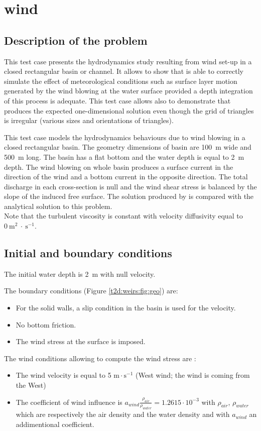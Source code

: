 \chapter{wind}
%
\section{Description of the problem}
\bigskip
This test case presents the hydrodynamics study resulting from wind set-up in a 
closed rectangular basin or channel.
It allows to show that  is able to correctly simulate the effect 
of meteorological conditions such as surface layer motion generated by the wind blowing
at the water surface provided a depth integration of this process is adequate.
This test case allows also to demonstrate that  produces the expected
one-dimensional solution even though the grid of triangles is irregular 
(various sizes and orientations of triangles).

\bigskip
This test case models the hydrodynamics behaviours due to wind blowing 
in a closed rectangular basin. The geometry dimensions of basin are 100~m wide 
and  500~m long. The basin has a flat bottom and the water depth is equal to 2~m depth. 
The wind blowing on whole basin produces a surface current in the direction of 
the wind and a bottom current in the opposite direction. The total discharge in each 
cross-section is null and the wind shear stress is balanced by the slope of the 
induced free surface. The solution produced by  is compared 
with the analytical solution to this problem. \\
Note that the turbulent viscosity is constant with velocity 
diffusivity equal to $0~\text{m}^2~\cdot~\text{s}^{-1}$.


\section{Initial and boundary conditions}
\bigskip
The initial water depth is 2~m with null velocity.

\bigskip
The boundary conditions (Figure \ref{t2d:weirs:fig:geo}) are:
\begin{itemize}
\item For the solid walls, a slip condition in the basin is used for the velocity.
\item No bottom friction.
\item The wind stress at the surface is imposed.
\end{itemize}
The wind conditions allowing to compute the wind stress are :
\begin{itemize}
\item The wind velocity is equal to 5 $\text{m}\cdot\text{s}^{-1}$ 
(West wind; the wind is coming from the West)
\item The coefficient of wind influence is
 $a_{wind} \frac{\rho_{air}}{\rho_{water}} = 1.2615 \cdot 10^{-3}$ 
 with $\rho_{air}$, $\rho_{water}$ which are respectively the air density 
 and the water density and with $a_{wind}$ an addimentional coefficient.
\end{itemize}

